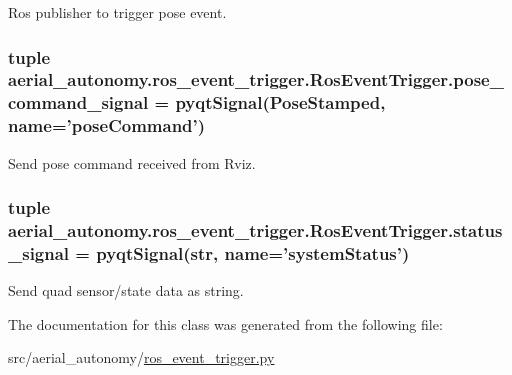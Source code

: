 Ros publisher to trigger pose event. 

\hypertarget{classaerial__autonomy_1_1ros__event__trigger_1_1RosEventTrigger_a9082897445ba520850cc7108aefe0d77}{
\subsubsection[{pose\-\_\-command\-\_\-signal}]{\setlength{\rightskip}{0pt plus 5cm}tuple aerial\-\_\-autonomy.\-ros\-\_\-event\-\_\-trigger.\-Ros\-Event\-Trigger.\-pose\-\_\-command\-\_\-signal = pyqt\-Signal(Pose\-Stamped, name='pose\-Command')\hspace{0.3cm}{\ttfamily [static]}}}\label{classaerial__autonomy_1_1ros__event__trigger_1_1RosEventTrigger_a9082897445ba520850cc7108aefe0d77}


Send pose command received from Rviz. 

\hypertarget{classaerial__autonomy_1_1ros__event__trigger_1_1RosEventTrigger_ad2e6e150ea166d252a7a40982875fe27}{
\subsubsection[{status\-\_\-signal}]{\setlength{\rightskip}{0pt plus 5cm}tuple aerial\-\_\-autonomy.\-ros\-\_\-event\-\_\-trigger.\-Ros\-Event\-Trigger.\-status\-\_\-signal = pyqt\-Signal(str, name='system\-Status')\hspace{0.3cm}{\ttfamily [static]}}}\label{classaerial__autonomy_1_1ros__event__trigger_1_1RosEventTrigger_ad2e6e150ea166d252a7a40982875fe27}


Send quad sensor/state data as string. 



The documentation for this class was generated from the following file\-:\begin{DoxyCompactItemize}
\item 
src/aerial\-\_\-autonomy/\hyperlink{ros__event__trigger_8py}{ros\-\_\-event\-\_\-trigger.\-py}\end{DoxyCompactItemize}
